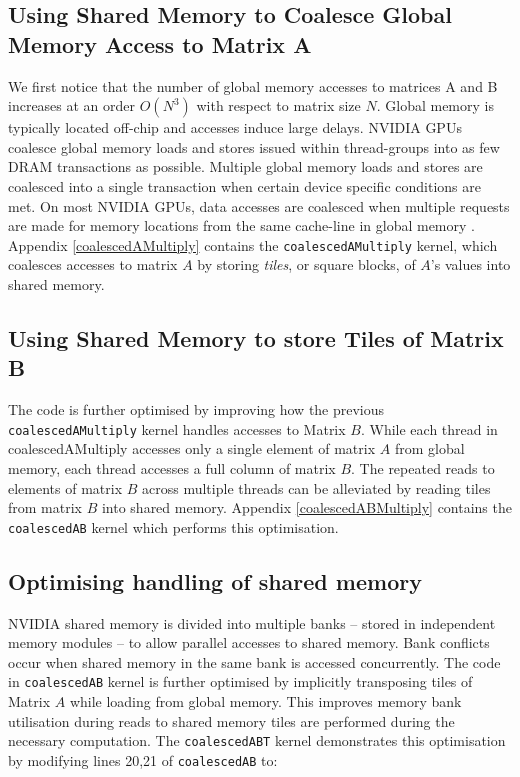 \documentclass[review=false, sigchi]{acmart}
\begin{document}
	\subsection{Using Shared Memory to Coalesce Global Memory Access to Matrix A} 
	
	We first notice that the number of global memory accesses to matrices A and B increases at an order $O(N^3)$ with respect to matrix size $N$. Global memory is typically located off-chip and accesses induce large delays. NVIDIA GPUs coalesce global memory loads and stores issued within thread-groups into as few DRAM transactions as possible. Multiple global memory loads and stores are coalesced into a single transaction when certain device specific conditions are met. On most NVIDIA GPUs, data accesses are coalesced when multiple requests are made for memory locations from the same cache-line in global memory \cite{cudamanual}. Appendix \ref{coalescedAMultiply} contains the \texttt{coalescedAMultiply} kernel, which coalesces accesses to matrix $A$ by storing \emph{tiles}, or square blocks, of $A$'s values into shared memory. 
	
	
	\subsection{Using Shared Memory to store Tiles of Matrix B} 
	
	The code is further optimised by improving how the previous \texttt{coalescedAMultiply} kernel handles accesses to Matrix $B$. While each thread in coalescedAMultiply accesses only a single element of matrix $A$ from global memory, each thread accesses a full column of matrix $B$. The repeated reads to elements of matrix $B$ across multiple threads can be alleviated by reading tiles from matrix $B$ into shared memory. Appendix \ref{coalescedABMultiply} contains the \texttt{coalescedAB} kernel which performs this optimisation.
	
	\subsection{Optimising handling of shared memory} 
	
	NVIDIA shared memory is divided into multiple banks -- stored in independent memory modules -- to allow parallel accesses to shared memory. Bank conflicts occur when shared memory in the same bank is accessed concurrently. The code in \texttt{coalescedAB} kernel is further optimised by implicitly transposing tiles of Matrix $A$ while loading from global memory. This improves memory bank utilisation during reads to shared memory tiles are performed during the necessary computation. The \texttt{coalescedABT} kernel demonstrates this optimisation by modifying lines 20,21 of \texttt{coalescedAB} to:
	
\end{document}
